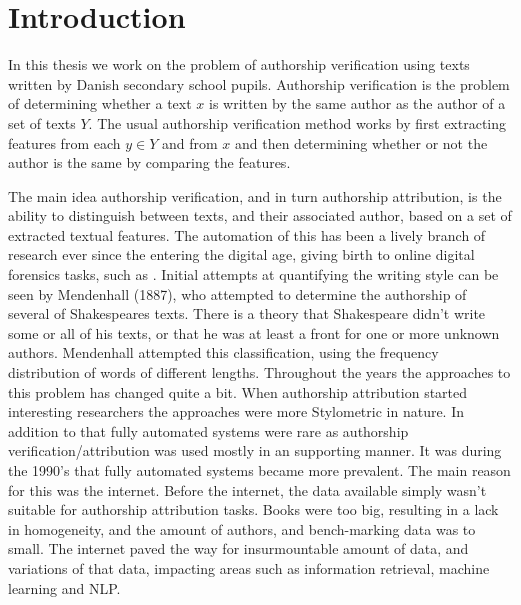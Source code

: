 \section{Introduction} \label{sec:introduction}

In this thesis we work on the problem of authorship verification using texts
written by Danish secondary school pupils. Authorship verification is the
problem of determining whether a text $x$ is written by the same author as the
author of a set of texts $Y$. The usual authorship verification method works by
first extracting features from each $y \in Y$ and from $x$ and then determining
whether or not the author is the same by comparing the features.

The main idea authorship verification, and in turn authorship attribution,
is the ability to distinguish between texts, and their associated author,
based on a set of extracted textual features. The automation of this has been
a lively branch of research ever since the entering the digital age, giving
birth to online digital forensics tasks, such as \cite{pan:2015}. Initial
attempts at quantifying the writing style can be seen by Mendenhall (1887), who
attempted to determine the authorship of several of Shakespeares texts. There
is a theory that Shakespeare didn't write some or all of his texts, or that he
was at least a front for one or more unknown authors. Mendenhall attempted this
classification, using the frequency distribution of words of different lengths.
Throughout the years the approaches to this problem has changed quite a bit.
When authorship attribution started interesting researchers the approaches were
more Stylometric in nature. In addition to that fully automated systems were
rare as authorship verification/attribution was used mostly in an supporting
manner. It was during the 1990's that fully automated systems became more
prevalent. The main reason for this was the internet. Before the internet, the
data available simply wasn't suitable for authorship attribution tasks. Books
were too big, resulting in a lack in homogeneity, and the amount of authors, and
bench-marking data was to small. The internet paved the way for insurmountable
amount of data, and variations of that data, impacting areas such as information
retrieval, machine learning and \gls{NLP}.

